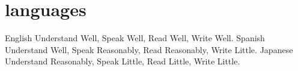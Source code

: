 \documentclass[]{src/twentysecondcv_en}
\begin{document}
\section{languages}

\begin{twentyshort}
  \twentyitemshort
    {English}
    {Understand Well, Speak Well, Read Well, Write Well.}
  \twentyitemshort
    {Spanish}
    {Understand Well, Speak Reasonably, Read Reasonably, Write Little.}
  \twentyitemshort
    {Japanese}
    {Understand Reasonably, Speak Little, Read Little, Write Little.}
\end{twentyshort}

\end{document}
